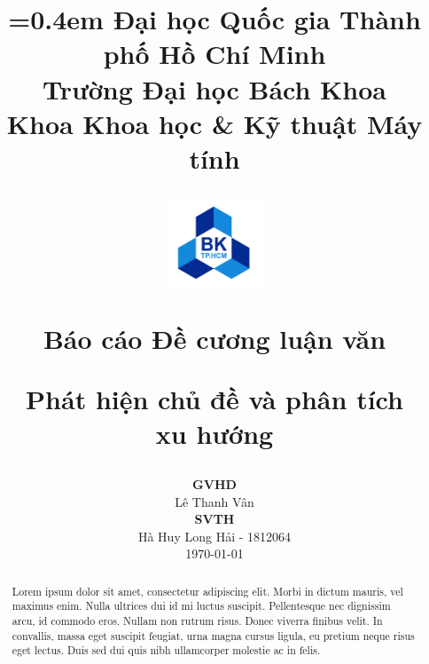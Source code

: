 \documentclass[11pt, a4paper]{article}
\renewcommand{\baselinestretch}{1.3}
\begin{document}
\title{
	{\parskip=0.4em\normalsize
			Đại học Quốc gia Thành phố Hồ Chí Minh\\
			Trường Đại học Bách Khoa\\
			Khoa Khoa học \& Kỹ thuật Máy tính\\
		}
	\vspace{0.5cm}
	\begin{figure}[!ht]
		\centering
		\includegraphics[width=0.26\textwidth]{img/logo/LogoBKChinhThuc.png}
	\end{figure}
	\vspace{0.1cm}
	\Large {Báo cáo Đề cương luận văn} \\
	\vspace{0.3cm}

	\Huge {\renewcommand{\baselinestretch}{0.1}
		Phát hiện chủ đề và phân tích\\[-0.2em]xu hướng}

	\vspace{0.3cm}
}
\author{}



\date{
	\textbf{\large GVHD}\\[0.3em]
	Lê Thanh Vân\\[2em]
	\textbf{\large SVTH}\\[0.3em]
	Hà Huy Long Hải - 1812064\\
	\vspace{4cm}
	\normalsize{\today}
}

\maketitle
\thispagestyle{empty}

\vspace{2cm}

\begin{abstract}
	Lorem ipsum dolor sit amet, consectetur adipiscing elit. Morbi in dictum
	mauris, vel maximus enim. Nulla ultrices dui id mi luctus suscipit.
	Pellentesque nec dignissim arcu, id commodo eros. Nullam non rutrum risus.
	Donec viverra finibus velit. In convallis, massa eget suscipit feugiat,
	urna magna cursus ligula, eu pretium neque risus eget lectus. Duis sed dui
	quis nibh ullamcorper molestie ac in felis.
\end{abstract}
\end{document}
